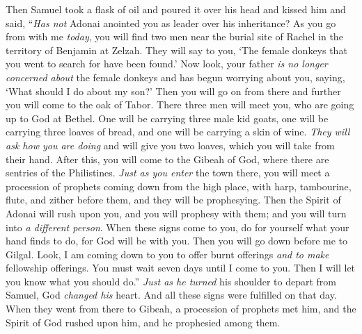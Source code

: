 \begin{biblechapter} %
 Then Samuel took a flask of oil and poured it over his head and kissed him and said, “\textit{Has not} Adonai anointed you as leader over his inheritance?
\verse As you go from with me \textit{today}, you will find two men near the burial site of Rachel in the territory of Benjamin at Zelzah. They will say to you, ‘The female donkeys that you went to search for have been found.’ Now look, your father \textit{is no longer concerned about} the female donkeys and has begun worrying about you, saying, ‘What should I do about my son?’
\verse Then you will go on from there and further you will come to the oak of Tabor. There three men will meet you, who are going up to God at Bethel. One will be carrying three male kid goats, one will be carrying three loaves of bread, and one will be carrying a skin of wine.
\verse \textit{They will ask how you are doing} and will give you two loaves, which you will take from their hand.
\verse After this, you will come to the Gibeah of God, where there are sentries of the Philistines. \textit{Just as you enter} the town there, you will meet a procession of prophets coming down from the high place, with harp, tambourine, flute, and zither before them, and they will be prophesying.
\verse Then the Spirit of Adonai will rush upon you, and you will prophesy with them; and you will turn into \textit{a different person}.
\verse When these signs come to you, do for yourself what your hand finds to do, for God will be with you.
\verse Then you will go down before me to Gilgal. Look, I am coming down to you to offer burnt offerings \textit{and to make} fellowship offerings. You must wait seven days until I come to you. Then I will let you know what you should do.”
\verse \textit{Just as he turned} his shoulder to depart from Samuel, God \textit{changed his} heart. And all these signs were fulfilled on that day.
\verse When they went from there to Gibeah, a procession of prophets met him, and the Spirit of God rushed upon him, and he prophesied among them.

\end{biblechapter}
